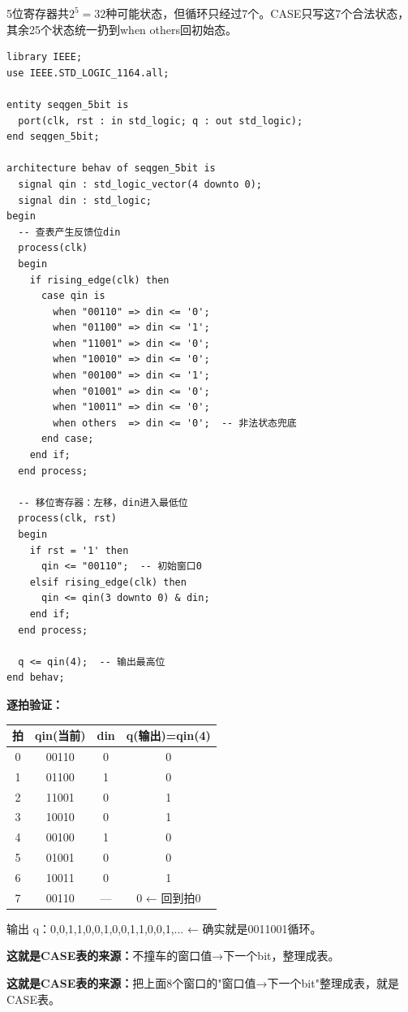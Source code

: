 5位寄存器共$2^5=32$种可能状态，但循环只经过7个。CASE只写这7个合法状态，其余25个状态统一扔到when others回初始态。

\begin{lstlisting}
library IEEE;
use IEEE.STD_LOGIC_1164.all;

entity seqgen_5bit is
  port(clk, rst : in std_logic; q : out std_logic);
end seqgen_5bit;

architecture behav of seqgen_5bit is
  signal qin : std_logic_vector(4 downto 0);
  signal din : std_logic;
begin
  -- 查表产生反馈位din
  process(clk)
  begin
    if rising_edge(clk) then
      case qin is
        when "00110" => din <= '0';
        when "01100" => din <= '1';
        when "11001" => din <= '0';
        when "10010" => din <= '0';
        when "00100" => din <= '1';
        when "01001" => din <= '0';
        when "10011" => din <= '0';
        when others  => din <= '0';  -- 非法状态兜底
      end case;
    end if;
  end process;

  -- 移位寄存器：左移，din进入最低位
  process(clk, rst)
  begin
    if rst = '1' then
      qin <= "00110";  -- 初始窗口0
    elsif rising_edge(clk) then
      qin <= qin(3 downto 0) & din;
    end if;
  end process;

  q <= qin(4);  -- 输出最高位
end behav;
\end{lstlisting}

\textbf{逐拍验证：}
\begin{center}
\begin{tabular}{|c|c|c|c|}
\hline
拍 & qin(当前) & din & q(输出)=qin(4) \\
\hline
0 & 00110 & 0 & 0 \\
1 & 01100 & 1 & 0 \\
2 & 11001 & 0 & 1 \\
3 & 10010 & 0 & 1 \\
4 & 00100 & 1 & 0 \\
5 & 01001 & 0 & 0 \\
6 & 10011 & 0 & 1 \\
7 & 00110 & — & 0 ← 回到拍0 \\
\hline
\end{tabular}
\end{center}

输出 q：0,0,1,1,0,0,1,0,0,1,1,0,0,1,... ← 确实就是0011001循环。

\textbf{这就是CASE表的来源：}不撞车的窗口值→下一个bit，整理成表。

\textbf{这就是CASE表的来源：}把上面8个窗口的"窗口值→下一个bit"整理成表，就是CASE表。

